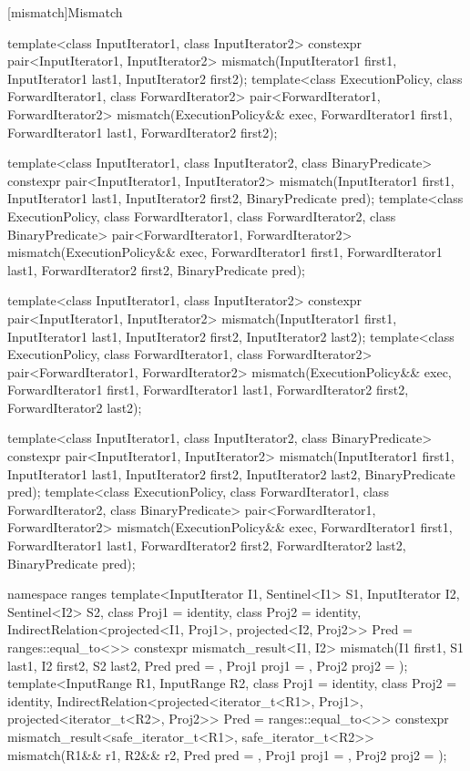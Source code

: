 [mismatch]{Mismatch}

%
\begin{itemdecl}
template<class InputIterator1, class InputIterator2>
  constexpr pair<InputIterator1, InputIterator2>
    mismatch(InputIterator1 first1, InputIterator1 last1,
             InputIterator2 first2);
template<class ExecutionPolicy, class ForwardIterator1, class ForwardIterator2>
  pair<ForwardIterator1, ForwardIterator2>
    mismatch(ExecutionPolicy&& exec,
             ForwardIterator1 first1, ForwardIterator1 last1,
             ForwardIterator2 first2);

template<class InputIterator1, class InputIterator2,
         class BinaryPredicate>
  constexpr pair<InputIterator1, InputIterator2>
    mismatch(InputIterator1 first1, InputIterator1 last1,
             InputIterator2 first2, BinaryPredicate pred);
template<class ExecutionPolicy, class ForwardIterator1, class ForwardIterator2,
         class BinaryPredicate>
  pair<ForwardIterator1, ForwardIterator2>
    mismatch(ExecutionPolicy&& exec,
             ForwardIterator1 first1, ForwardIterator1 last1,
             ForwardIterator2 first2, BinaryPredicate pred);

template<class InputIterator1, class InputIterator2>
  constexpr pair<InputIterator1, InputIterator2>
    mismatch(InputIterator1 first1, InputIterator1 last1,
             InputIterator2 first2, InputIterator2 last2);
template<class ExecutionPolicy, class ForwardIterator1, class ForwardIterator2>
  pair<ForwardIterator1, ForwardIterator2>
    mismatch(ExecutionPolicy&& exec,
             ForwardIterator1 first1, ForwardIterator1 last1,
             ForwardIterator2 first2, ForwardIterator2 last2);

template<class InputIterator1, class InputIterator2,
         class BinaryPredicate>
  constexpr pair<InputIterator1, InputIterator2>
    mismatch(InputIterator1 first1, InputIterator1 last1,
             InputIterator2 first2, InputIterator2 last2,
             BinaryPredicate pred);
template<class ExecutionPolicy, class ForwardIterator1, class ForwardIterator2,
         class BinaryPredicate>
  pair<ForwardIterator1, ForwardIterator2>
    mismatch(ExecutionPolicy&& exec,
             ForwardIterator1 first1, ForwardIterator1 last1,
             ForwardIterator2 first2, ForwardIterator2 last2,
             BinaryPredicate pred);

namespace ranges {
  template<InputIterator I1, Sentinel<I1> S1, InputIterator I2, Sentinel<I2> S2,
      class Proj1 = identity, class Proj2 = identity,
      IndirectRelation<projected<I1, Proj1>, projected<I2, Proj2>> Pred = ranges::equal_to<>>
    constexpr mismatch_result<I1, I2>
      mismatch(I1 first1, S1 last1, I2 first2, S2 last2, Pred pred = {},
               Proj1 proj1 = {}, Proj2 proj2 = {});
  template<InputRange R1, InputRange R2,
      class Proj1 = identity, class Proj2 = identity,
      IndirectRelation<projected<iterator_t<R1>, Proj1>,
        projected<iterator_t<R2>, Proj2>> Pred = ranges::equal_to<>>
    constexpr mismatch_result<safe_iterator_t<R1>, safe_iterator_t<R2>>
      mismatch(R1&& r1, R2&& r2, Pred pred = {},
               Proj1 proj1 = {}, Proj2 proj2 = {});
}
\end{itemdecl}

